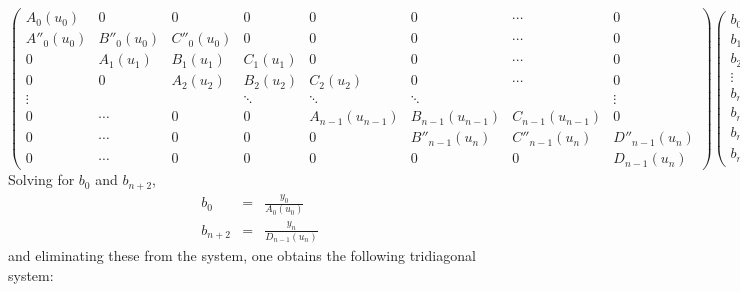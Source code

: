 \documentclass[a4paper,10pt,twosided]{article}
\begin{document}
\begin{equation}
   \left( \begin{array}{ccccccccccccc}  
      A_0(u_0)  & 0        & 0        & 0        & 0        & 0& \cdots & 0 
  \\  A''_0(u_0) & B''_0(u_0) & C''_0(u_0)  & 0 & 0  & 0 & \cdots & 0
  \\  0         & A_1(u_1) & B_1(u_1) & C_1(u_1) & 0        & 0& \cdots & 0 
  \\  0         & 0        & A_2(u_2) & B_2(u_2) & C_2(u_2) & 0& \cdots & 0 
  \\ \vdots     &          &          & \ddots   & \ddots   & \ddots &   & \vdots
  \\  0 &  \cdots & 0 & 0 & A_{n-1}(u_{n-1}) & B_{n-1}(u_{n-1}) & C_{n-1}(u_{n-1})& 0 
  \\  0  & \cdots  & 0& 0  & 0 &  B''_{n-1}(u_n) & C''_{n-1}(u_n) & D''_{n-1}(u_n)  
  \\  0  & \cdots  & 0& 0  & 0 &  0           &  0            & D_{n-1}(u_n)
    \end{array} \right) 
   \left( \begin{array}{c} b_0 \\ b_1 \\ b_2 \\ \vdots \\ b_{n-1} \\ b_n \\ b_{n+1} \\ b_{n+2} \end{array}  \right) 
   = \left( \begin{array}{c} y_0 \\  0 \\ y_1 \\ y_2 \\ \vdots \\ y_{n-1} \\ 0 \\  y_n  \end{array}\right)
\end{equation}
Solving for $b_0$ and $b_{n+2}$,
\begin{eqnarray*}
     b_0     & = & \frac{ y_0 }{A_0(u_0)  }
\\   b_{n+2} & = & \frac{ y_n }{D_{n-1}(u_n) }
\end{eqnarray*}
and eliminating these from the system, one obtains the following tridiagonal system:
\end{document}
